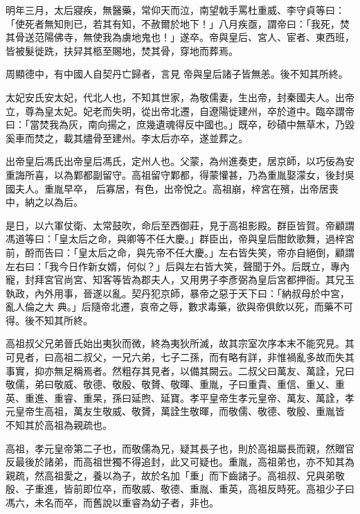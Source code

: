 \begin{pinyinscope}
 明年三月，太后寢疾，無醫藥，常仰天而泣，南望戟手罵杜重威、李守貞等曰：「使死者無知則已，若其有知，不赦爾於地下！」八月疾亟，謂帝曰：「我死，焚其骨送范陽佛寺，無使我為虜地鬼也！」遂卒。帝與皇后、宮人、宦者、東西班，皆被髮徙跣，扶舁其柩至賜地，焚其骨，穿地而葬焉。



 周顯德中，有中國人自契丹亡歸者，言見
 帝與皇后諸子皆無恙。後不知其所終。



 太妃安氏安太妃，代北人也，不知其世家，為敬儒妻，生出帝，封秦國夫人。出帝立，尊為皇太妃。妃老而失明，從出帝北遷，自遼陽徙建州，卒於道中。臨卒謂帝曰：「當焚我為灰，南向揚之，庶幾遺魂得反中國也。」既卒，砂磧中無草木，乃毀奚車而焚之，載其燼骨至建州。李太后亦卒，遂並葬之。



 出帝皇后馮氏出帝皇后馮氏，定州人也。父蒙，為州進奏吏，居京師，以巧佞為安重誨所喜，以為鄴都副留守。高祖留守鄴都，得蒙懽甚，乃為重胤娶濛女，後封吳國夫人。重胤早卒，
 后寡居，有色，出帝悅之。高祖崩，梓宮在殯，出帝居喪中，納之以為后。



 是日，以六軍仗衛、太常鼓吹，命后至西御莊，見于高祖影殿。群臣皆賀。帝顧謂馮道等曰：「皇太后之命，與卿等不任大慶。」群臣出，帝與皇后酣飲歌舞，過梓宮前，酹而告曰：「皇太后之命，與先帝不任大慶。」左右皆失笑，帝亦自絕倒，顧謂左右曰：「我今日作新女婿，何似？」后與左右皆大笑，聲聞于外。后既立，專內寵，封拜宮官尚宮、知客等皆為郡夫人，又用男子李彥弼為皇后宮都押衙。其兄玉執政，內外用事，晉遂以亂。契丹犯京師，暴帝之惡于天下曰：「納叔母於中宮，亂人倫之大
 典。」后隨帝北遷，哀帝之辱，數求毒藥，欲與帝俱飲以死，而藥不可得。後不知其所終。



 高祖叔父兄弟晉氏始出夷狄而微，終為夷狄所滅，故其宗室次序本末不能究見。其可見者，曰高祖二叔父，一兄六弟，七子二孫，而有略有詳，非惟禍亂多故而失其事實，抑亦無足稱焉者。然粗存其見者，以備其闕云。二叔父曰萬友、萬詮，兄曰敬儒，弟曰敬威、敬德、敬殷、敬贇、敬暉、重胤，子曰重貴、重信、重乂、重英、重進、重睿、重杲，孫曰延煦、延寶。孝平皇帝生孝元皇帝、萬友、萬詮，孝元皇帝生高祖，萬友生敬威、敬贇，萬詮生敬暉，而敬儒、敬德、敬殷、重胤皆
 不知其於高祖為親疏也。



 高祖，孝元皇帝第二子也，而敬儒為兄，疑其長子也，則於高祖屬長而親，然贈官反最後於諸弟，而高祖世獨不得追封，此又可疑也。重胤，高祖弟也，亦不知其為親疏，然高祖愛之，養以為子，故於名加「重」而下齒諸子。高祖叔、兄與弟敬殷、子重進，皆前即位卒，而敬威、敬德、重胤、重英，高祖反時死。高祖少子曰馮六，未名而卒，而舊說以重睿為幼子者，非也。




\end{pinyinscope}
